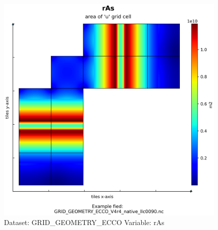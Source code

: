 \begin{figure}[H]
\centering
\includegraphics[scale=0.55]{../images/plots/native_plots_coords/Geometry_Parameters_for_the_Lat-Lon-Cap_90_(llc90)_Native_Model_Grid_(Version_4_Release_4)/rAs.png}
\caption{Dataset: GRID\_GEOMETRY\_ECCO Variable: rAs}
\label{tab:table-GRID_GEOMETRY_ECCO_rAs-Plot}
\end{figure}
\pagebreak
